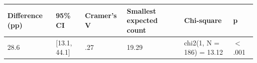 \begin{tabular}{llllll}
  \toprule
Difference (pp) & 95\% CI & Cramer's V & Smallest expected count & Chi-square & p \\ 
  \midrule
28.6 & [13.1, 44.1] & .27 & 19.29 & chi2(1, N = 186) = 13.12 & $<$ .001 \\ 
   \bottomrule
\end{tabular}
